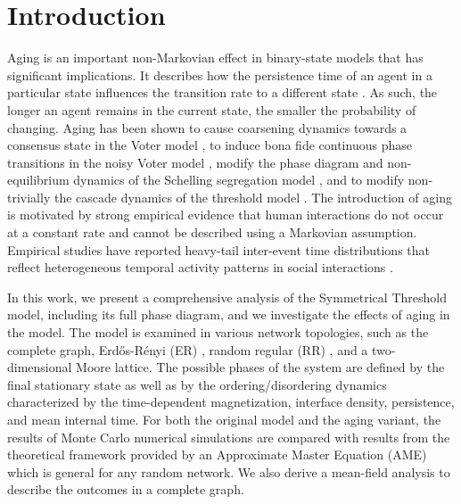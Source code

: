 \section{\label{sec:Introduction} Introduction}
	
Aging is an important non-Markovian effect in binary-state models that has significant implications. It describes how the persistence time of an agent in a particular state influences the transition rate to a different state \cite{stark-2008, fernandez-gracia-2011, perez-2016, boguna-2014, chen-2020}. As such, the longer an agent remains in the current state, the smaller the probability of changing. Aging has been shown to cause coarsening dynamics towards a consensus state in the Voter model \cite{fernandez-gracia-2011,peralta-2020C}, to induce bona fide continuous phase transitions in the noisy Voter model \cite{artime-2018,peralta-2020A}, modify the phase diagram and non-equilibrium dynamics of the Schelling segregation model \cite{Abella-2022}, and to modify non-trivially the cascade dynamics of the threshold model \cite{Abella-2022-AME}. The introduction of aging is motivated by strong empirical evidence that human interactions do not occur at a constant rate and cannot be described using a Markovian assumption. Empirical studies have reported heavy-tail inter-event time distributions that reflect heterogeneous temporal activity patterns in social interactions \cite{karsai-2011, rybski-2009, zignani-2016, artime-2017, kumar-2020}.
	
In this work, we present a comprehensive analysis of the Symmetrical Threshold model, including its full phase diagram, and we investigate the effects of aging in the model. The model is examined in various network topologies, such as the complete graph, Erd\H{o}s-Rényi (ER)  \cite{erdos1960evolution}, random regular (RR) \cite{wormald1999models}, and a two-dimensional Moore lattice. The possible phases of the system are defined by the final stationary state as well as by the ordering/disordering dynamics characterized by the time-dependent magnetization, interface density, persistence, and mean internal time. For both the original model and the aging variant, the results of Monte Carlo numerical simulations are compared with results from the theoretical framework provided by an Approximate Master Equation (AME)\cite{gleeson-2013,Abella-2022-AME} %
which is general for any random network. We also derive a mean-field analysis to describe the outcomes in a complete graph.
	
